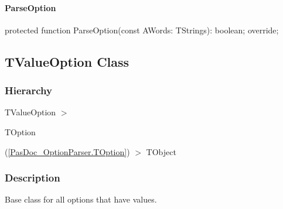 \documentclass{report}
\newif\ifpdf
\begin{document}
\paragraph*{ParseOption}\hspace*{\fill}

\label{PasDoc_OptionParser.TBoolOption-ParseOption}
\begin{list}{}{
\setlength{\itemindent}{0cm}
\setlength{\listparindent}{0cm}
\setlength{\leftmargin}{\evensidemargin}
\addtolength{\leftmargin}{\tmplength}
\settowidth{\labelsep}{X}
\addtolength{\leftmargin}{\labelsep}
\setlength{\labelwidth}{\tmplength}
}
\item[\textbf{Declaration}\hfill]
\ifpdf
\begin{flushleft}
\fi
\begin{ttfamily}
protected function ParseOption(const AWords: TStrings): boolean; override;\end{ttfamily}

\ifpdf
\end{flushleft}
\fi

\end{list}
\ifpdf
\subsection*{\large{\textbf{TValueOption Class}}\normalsize\hspace{1ex}\hrulefill}
\else
\subsection*{TValueOption Class}
\fi
\label{PasDoc_OptionParser.TValueOption}
\subsubsection*{\large{\textbf{Hierarchy}}\normalsize\hspace{1ex}\hfill}
TValueOption {$>$} \begin{ttfamily}TOption\end{ttfamily}(\ref{PasDoc_OptionParser.TOption}) {$>$} 
TObject
\subsubsection*{\large{\textbf{Description}}\normalsize\hspace{1ex}\hfill}
Base class for all options that have values.\hfill\vspace*{1ex}
\end{document}
